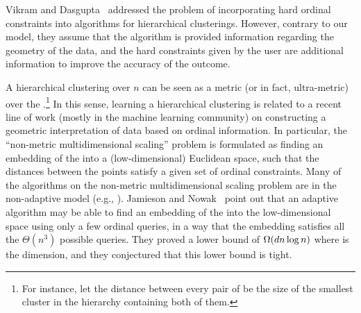 Vikram and Dasgupta~\cite{vikram-dasgupta:2016:interactive-hierarchical-clustering}
addressed the problem of incorporating hard ordinal constraints
into algorithms for hierarchical clusterings.
However, contrary to our model, they assume that
the algorithm is provided information regarding the geometry of the data,
and the hard constraints given by the user are
additional information to improve the accuracy of the outcome.

A hierarchical clustering over $n$ \elements
can be seen as a metric (or in fact, ultra-metric)
over the \elements.\footnote{For instance,
let the distance between every pair of \elements
be the size of the smallest cluster in the hierarchy
containing both of them.}
In this sense, learning a hierarchical clustering is related
to a recent line of work (mostly in the machine learning community)
\cite{agarwal-wills-cayton-lanckriet-kriegman-belongie:2007:embedding,%
jamieson-nowak:2011:embedding,%
jamieson-nowak:2011:active-ranking,%
McFee-lanckriet:2011:multi-model-similarity,%
tamuz-liu-belongie-shamir-kalai:2011:learning-kernel,%
VanDerMaaten-weinberger:2012:stochastic-triplet-embedding,%
kleindessner-vonLuxburg:2014:embedding-uniqueness,%
jain-jamieson-nowak:2016:ordinal-embedding}
on constructing a geometric interpretation of data
based on ordinal information.
In particular, the ``non-metric multidimensional scaling'' problem
\cite{agarwal-wills-cayton-lanckriet-kriegman-belongie:2007:embedding,%
jamieson-nowak:2011:embedding,%
kleindessner-vonLuxburg:2014:embedding-uniqueness,%
jain-jamieson-nowak:2016:ordinal-embedding} is formulated as
finding an embedding of the \elements
into a (low-dimensional) Euclidean space,
such that the distances between the points
satisfy a given set of ordinal constraints.
Many of the algorithms on the non-metric multidimensional scaling
problem are in the non-adaptive model (e.g.,
\cite{agarwal-wills-cayton-lanckriet-kriegman-belongie:2007:embedding,%
jain-jamieson-nowak:2016:ordinal-embedding}).
Jamieson and Nowak~\cite{jamieson-nowak:2011:embedding}
point out that an adaptive algorithm may be able to
find an embedding of the \elements into the low-dimensional space
using only a few ordinal queries,
in a way that the embedding satisfies
all the $\Theta(n^3)$ possible queries.
They proved a lower bound of $\Omega(d n \log n)$
where \Dimension is the dimension,
and they conjectured that this lower bound is tight.

